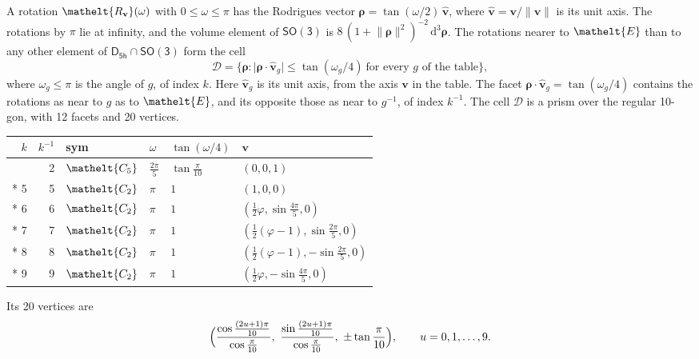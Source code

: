 \documentclass[10pt,a4paper]{article}
\numberwithin{equation}{section}
\newcommand{\eltfont}[1]{{\let\sigma\eltsigma\mathelt{#1}}}
\newcommand{\grp}[1]{\mathsf{#1}}
\newcommand{\cls}[1]{\eltfont{#1}}
\newcommand{\elt}[1]{\eltfont{#1}}
\newcommand{\dirvec}[3]{(#1, #2, #3)}
\newcommand{\unitaxis}{\hat{\mathbf{v}}}
\newcommand{\vv}{\mathbf{v}}
\newcommand{\diff}{\mathrm{d}}
\newcommand{\goldenratio}{\varphi}
\newcommand{\rodrigues}{\boldsymbol{\rho}}
\newcommand{\fcell}{\mathcal{D}}
\begin{document}
\leavevmode\label{n:vector.rodrigues}\label{n:vector.unitaxis}A rotation $\elt{R_{\vv}}(\omega)$ with $0 \le \omega \le \pi$ has the Rodrigues vector $\rodrigues = \tan(\omega/2)\,\unitaxis$, where $\unitaxis = \vv/\lVert\vv\rVert$ is its unit axis. The rotations by $\pi$ lie at infinity, and the volume element of \href{SO3.pdf}{$\grp{SO(3)}$} is $8\,(1 + \lVert\rodrigues\rVert^2)^{-2}\,\diff^3\rodrigues$.
\leavevmode\label{n:set.cell}The rotations nearer to $\elt{E}$ than to any other element of $\grp{D_{5h}} \cap \grp{SO(3)}$ form the cell
\begin{equation}\label{e:cell}\fcell = \bigl\{\rodrigues : \lvert\rodrigues\cdot\unitaxis_g\rvert \le \tan(\omega_g/4)\ \text{for every $g$ of the table}\bigr\},\end{equation}
where $\omega_g \le \pi$ is the angle of $g$, of index $k$. Here $\unitaxis_g$ is its unit axis, from the axis $\vv$ in the table. The facet $\rodrigues\cdot\unitaxis_g = \tan(\omega_g/4)$ contains the rotations as near to $g$ as to $\elt{E}$, and its opposite those as near to $g^{-1}$, of index $k^{-1}$. The cell $\fcell$ is a prism over the regular 10-gon, with 12 facets and 20 vertices.
{\small{\renewcommand{\arraystretch}{1.3}\begin{longtable}{@{}rrllll@{}}\toprule
$k$ & $k^{-1}$ & sym & $\omega$ & $\tan(\omega/4)$ & $\vv$\\\midrule\endhead
\bottomrule\endfoot\endlastfoot
1 & 2 & $\cls{C_{5}}$ & $\tfrac{2\pi}{5}$ & $\tan\tfrac{\pi}{10}$ & $\dirvec{0}{0}{1}$\\*
5 & 5 & $\cls{C_{2}}$ & $\pi$ & $1$ & $\dirvec{1}{0}{0}$\\*
6 & 6 & $\cls{C_{2}}$ & $\pi$ & $1$ & $\dirvec{\tfrac{1}{2}\goldenratio{}}{\sin\tfrac{4\pi}{5}}{0}$\\*
7 & 7 & $\cls{C_{2}}$ & $\pi$ & $1$ & $\dirvec{\tfrac{1}{2}(\goldenratio - 1)}{\sin\tfrac{2\pi}{5}}{0}$\\*
8 & 8 & $\cls{C_{2}}$ & $\pi$ & $1$ & $\dirvec{\tfrac{1}{2}(\goldenratio - 1)}{-\sin\tfrac{2\pi}{5}}{0}$\\*
9 & 9 & $\cls{C_{2}}$ & $\pi$ & $1$ & $\dirvec{\tfrac{1}{2}\goldenratio{}}{-\sin\tfrac{4\pi}{5}}{0}$\\
\bottomrule\end{longtable}}}
\leavevmode\label{n:local.vertex.u}Its 20 vertices are
\begin{equation}\label{e:prism}\Bigl(\frac{\cos\frac{(2u+1)\pi}{10}}{\cos\frac{\pi}{10}},\ \frac{\sin\frac{(2u+1)\pi}{10}}{\cos\frac{\pi}{10}},\ \pm\tan\frac{\pi}{10}\Bigr),\qquad u = 0, 1, \dots, 9.\end{equation}
\end{document}
